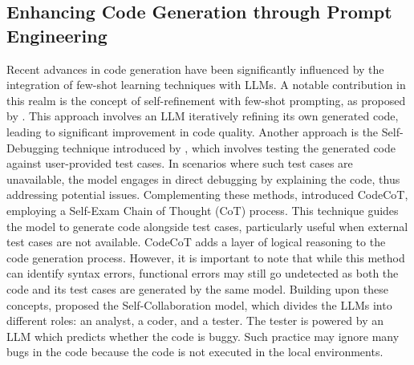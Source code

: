 \documentclass[manuscript,screen,review]{acmart}
\newcommand{\jie}[1]{{\color{blue}(Jie says: #1)}}
\begin{document}
\subsection{Enhancing Code Generation through Prompt Engineering}
Recent advances in code generation have been significantly influenced by the integration of few-shot learning techniques with LLMs. A notable contribution in this realm is the concept of self-refinement with few-shot prompting, as proposed by \citeauthor{Madaan2023SelfRefineIR}. This approach involves an LLM iteratively refining its own generated code, leading to significant improvement in code quality. Another approach is the Self-Debugging technique introduced by \citeauthor{Chen2023TeachingLL}, which involves testing the generated code against user-provided test cases. In scenarios where such test cases are unavailable, the model engages in direct debugging by explaining the code, thus addressing potential issues. Complementing these methods, \citeauthor{Huang2023CodeCoTAB} introduced CodeCoT, employing a Self-Exam Chain of Thought (CoT) process. This technique guides the model to generate code alongside test cases, particularly useful when external test cases are not available. CodeCoT adds a layer of logical reasoning to the code generation process. However, it is important to note that while this method can identify syntax errors, functional errors may still go undetected as both the code and its test cases are generated by the same model. Building upon these concepts, \citeauthor{Dong2023SelfcollaborationCG} proposed the Self-Collaboration model, which divides the LLMs into different roles: an analyst, a coder, and a tester. The tester is powered by an LLM which predicts whether the code is buggy. Such practice may ignore many bugs in the code because the code is not executed in the local environments. 
\end{document}
